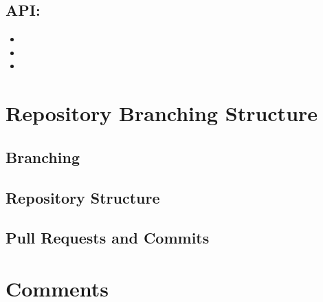 \documentclass[hidelinks, 12pt, a4paper]{article}
\begin{document}
        \subsection{\large{\textbf{API:}}}
        \begin{itemize}[]
            \item  
            \item  
            \item 
        \end{itemize}
        
\newpage
        
\section{Repository Branching Structure}
\subsection{Branching}
\vspace{0.5cm} 

\subsection{Repository Structure}
\vspace{0.5cm} 

\subsection{Pull Requests and Commits}
\vspace{0.5cm} 

\newpage  

\section{Comments}
\newpage
\end{document}
